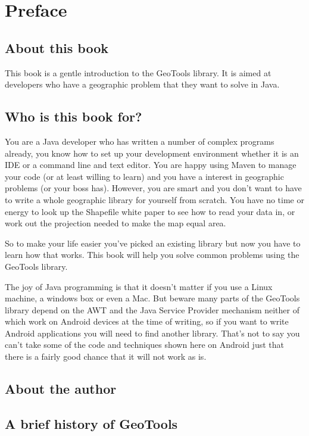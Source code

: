 \chapter*{Preface}
\section*{About this book}
This book is a gentle introduction to the GeoTools library. It is aimed at developers who have a geographic problem that they want to solve in Java. 

\section*{Who is this book for?}
You are a Java developer who has written a number of complex programs already, you know how to set up your development environment whether it is an IDE or a command line and text editor. You are happy using Maven to manage your code (or at least willing to learn) and you have a interest in geographic problems (or your boss has). However, you are smart and you don't want to have to write a whole geographic library for yourself from scratch. You have no time or energy to look up the Shapefile white paper \citep{ESRI1997} to see how to read your data in, or work out the projection needed to make the map equal area. 

So to make your life easier you've picked an existing library but now you have to learn how that works. This book will help you solve common problems using the GeoTools library.

The joy of Java programming is that it doesn't matter if you use a Linux machine, a windows box or even a Mac. But beware many parts of the GeoTools library depend on the AWT and the Java Service Provider mechanism neither of which work on Android devices at the time of writing, so if you want to write Android applications you will need to find another library. That's not to say you can't take some of the code and techniques shown here on Android just that there is a fairly good chance that it will not work as is.
 
\section*{About the author}

\section*{A brief history of GeoTools}